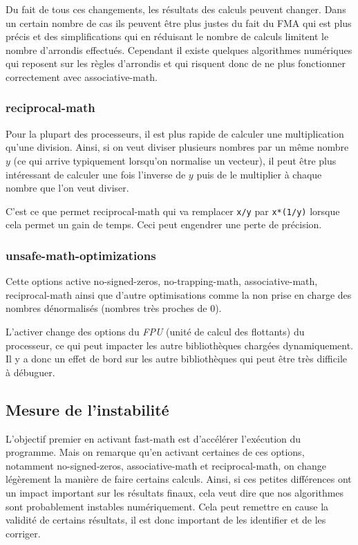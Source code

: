 \documentclass[a4paper,11pt]{report}
\begin{document}
Du fait de tous ces changements, les résultats des calculs peuvent changer.
Dans un certain nombre de cas ils peuvent être plus justes du fait du FMA qui est plus précis et des simplifications qui en réduisant le nombre de calculs limitent le nombre d'arrondis effectués.
Cependant il existe quelques algorithmes numériques qui reposent sur les règles d'arrondis et qui risquent donc de ne plus fonctionner correctement avec associative-math.

\subsubsection{reciprocal-math}
Pour la plupart des processeurs, il est plus rapide de calculer une multiplication qu'une division.
Ainsi, si on veut diviser plusieurs nombres par un même nombre $y$ (ce qui arrive typiquement lorsqu'on normalise un vecteur), il peut être plus intéressant de calculer une fois l'inverse de $y$ puis de le multiplier à chaque nombre que l'on veut diviser.

C'est ce que permet reciprocal-math qui va remplacer \verb'x/y' par \verb'x*(1/y)' lorsque cela permet un gain de temps.
Ceci peut engendrer une perte de précision.

\subsubsection{unsafe-math-optimizations}
Cette options active no-signed-zeros, no-trapping-math, associative-math, reciprocal-math ainsi que d'autre optimisations comme la non prise en charge des nombres dénormalisés (nombres très proches de $0$).

L'activer change des options du \emph{FPU} (unité de calcul des flottants) du processeur, ce qui peut impacter les autre bibliothèques chargées dynamiquement.
Il y a donc un effet de bord sur les autre bibliothèques qui peut être très difficile à débuguer.

\subsection{Mesure de l'instabilité}
L'objectif premier en activant fast-math est d'accélérer l'exécution du programme.
Mais on remarque qu'en activant certaines de ces options, notamment no-signed-zeros, associative-math et reciprocal-math, on change légèrement la manière de faire certains calculs.
Ainsi, si ces petites différences ont un impact important sur les résultats finaux, cela veut dire que nos algorithmes sont probablement instables numériquement.
Cela peut remettre en cause la validité de certains résultats, il est donc important de les identifier et de les corriger.
\end{document}
